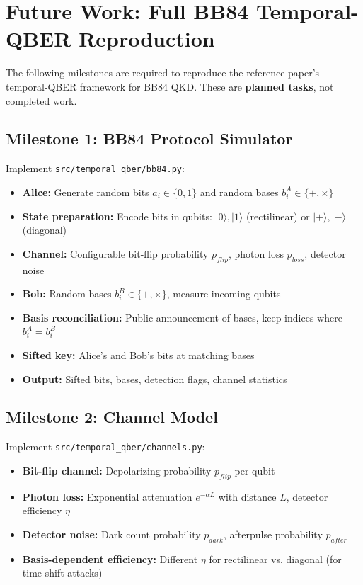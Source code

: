 \section{Future Work: Full BB84 Temporal-QBER Reproduction}
\label{sec:future_work}

The following milestones are required to reproduce the reference paper's temporal-QBER framework for BB84 QKD. These are \textbf{planned tasks}, not completed work.

\subsection{Milestone 1: BB84 Protocol Simulator}
\label{milestone:bb84}
Implement \texttt{src/temporal\_qber/bb84.py}:
\begin{itemize}
    \item \textbf{Alice:} Generate random bits $a_i \in \{0,1\}$ and random bases $b_i^A \in \{+, \times\}$
    \item \textbf{State preparation:} Encode bits in qubits: $|0\rangle, |1\rangle$ (rectilinear) or $|+\rangle, |-\rangle$ (diagonal)
    \item \textbf{Channel:} Configurable bit-flip probability $p_{flip}$, photon loss $p_{loss}$, detector noise
    \item \textbf{Bob:} Random bases $b_i^B \in \{+, \times\}$, measure incoming qubits
    \item \textbf{Basis reconciliation:} Public announcement of bases, keep indices where $b_i^A = b_i^B$
    \item \textbf{Sifted key:} Alice's and Bob's bits at matching bases
    \item \textbf{Output:} Sifted bits, bases, detection flags, channel statistics
\end{itemize}

\subsection{Milestone 2: Channel Model}
\label{milestone:channel}
Implement \texttt{src/temporal\_qber/channels.py}:
\begin{itemize}
    \item \textbf{Bit-flip channel:} Depolarizing probability $p_{flip}$ per qubit
    \item \textbf{Photon loss:} Exponential attenuation $e^{-\alpha L}$ with distance $L$, detector efficiency $\eta$
    \item \textbf{Detector noise:} Dark count probability $p_{dark}$, afterpulse probability $p_{after}$
    \item \textbf{Basis-dependent efficiency:} Different $\eta$ for rectilinear vs. diagonal (for time-shift attacks)
\end{itemize}

